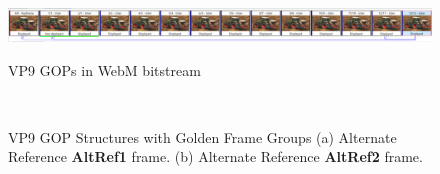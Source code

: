 \documentclass{book}
\begin{document}
\begin{figure}[hbt!]
	\centering
	{\includegraphics[width=\columnwidth]{pictures/ch5/VP9_GOP_Bitstream_visual.png}
		\label{fig:GOPs-in-Bitstream}}
	\caption{VP9 GOPs in WebM bitstream}
\end{figure}
\begin{figure}[hbt!]
	\centering
	 \\

	\caption{VP9 GOP Structures with Golden Frame Groups
		(a) Alternate Reference \textbf{AltRef1} frame.
		(b) Alternate Reference \textbf{AltRef2} frame.}     
	\label{fig:VP9GOPs}
\end{figure}
\end{document}
